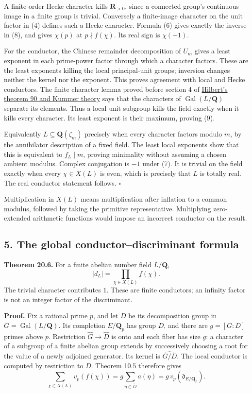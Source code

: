 \documentclass[11pt,a4paper]{article}
\begin{document}
A finite-order Hecke character kills \(\mathbf R_{>0}\), since a
connected group's continuous image in a finite group is trivial.
Conversely a finite-image character on the unit factor in (4) defines
such a Hecke character. Formula (6) gives exactly the inverse in (8),
and gives \(\chi(p)\) at \(p\nmid f(\chi)\). Its real sign is
\(\chi(-1)\).

For the conductor, the Chinese remainder decomposition of \(U_m\) gives
a least exponent in each prime-power factor through which a character
factors. These are the least exponents killing the local principal-unit
groups; inversion changes neither the kernel nor the exponent. This
proves agreement with local and Hecke conductors. The finite character
lemma proved before section 4 of
\href{../hilberts-theorem-90-and-kummer-theory.html}{Hilbert's theorem
90 and Kummer theory} says that the characters of
\(\operatorname{Gal}(L/\mathbf Q)\) separate its elements. Thus a local
unit subgroup kills the field exactly when it kills every character. Its
least exponent is their maximum, proving (9).

Equivalently \(L\subseteq\mathbf Q(\zeta_m)\) precisely when every
character factors modulo \(m\), by the annihilator description of a
fixed field. The least local exponents show that this is equivalent to
\(f_L\mid m\), proving minimality without assuming a chosen ambient
modulus. Complex conjugation is \(-1\) under (7). It is trivial on the
field exactly when every \(\chi\in X(L)\) is even, which is precisely
that \(L\) is totally real. The real conductor statement follows.
\(\square\)

Multiplication in \(X(L)\) means multiplication after inflation to a
common modulus, followed by taking the primitive representative.
Multiplying zero-extended arithmetic functions would impose an incorrect
conductor on the result.

\subsection{5. The global conductor--discriminant
formula}\label{the-global-conductordiscriminant-formula}

\textbf{Theorem 20.6.} For a finite abelian number field
\(L/\mathbf Q\), \[
|d_L|=\prod_{\chi\in X(L)}f(\chi).
\tag{10}
\] The trivial character contributes \(1\). These are finite conductors;
an infinity factor is not an integer factor of the discriminant.

\textbf{Proof.} Fix a rational prime \(p\), and let \(D\) be its
decomposition group in \(G=\operatorname{Gal}(L/\mathbf Q)\). Its
completion \(E/\mathbf Q_p\) has group \(D\), and there are \(g=[G:D]\)
primes above \(p\). Restriction \(\widehat G\to\widehat D\) is onto and
each fiber has size \(g\): a character of a subgroup of a finite abelian
group extends by successively choosing a root for the value of a newly
adjoined generator. Its kernel is \(\widehat{G/D}\). The local conductor
is computed by restriction to \(D\). Theorem 10.5 therefore gives \[
\sum_{\chi\in X(L)}v_p(f(\chi))
=g\sum_{\eta\in\widehat D}a(\eta)
=g\,v_p(\mathfrak d_{E/\mathbf Q_p}).
\tag{11}
\]
\end{document}
